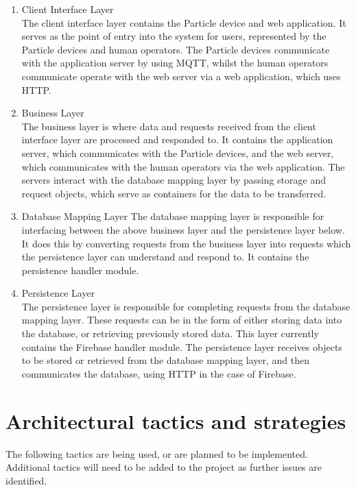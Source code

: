 \documentclass{article}
\begin{document}
		\begin{enumerate}
			\item Client Interface Layer\\
			The client interface layer contains the Particle device and web 
			application. It serves as the point of entry into the system for 
			users, represented by the Particle devices and human operators. 
			The Particle devices communicate with the application server by 
			using MQTT, whilst the human operators communicate operate with 
			the web server via a web application, which uses HTTP.
			\item Business Layer\\
			The business layer is where data and requests received from the 
			client interface layer are processed and responded to. It 
			contains the application server, which communicates with the 
			Particle devices, and the web server, which communicates with the 
			human operators via the web application. The servers interact 
			with the database mapping layer by passing storage and request 
			objects, which serve as containers for the data to be transferred.
			\item Database Mapping Layer
			The database mapping layer is responsible for interfacing between 
			the above business layer and the persistence layer below. It does 
			this by converting requests from the business layer into requests 
			which the persistence layer can understand and respond to. It 
			contains the persistence handler module.
			\item Persistence Layer\\
			The persistence layer is responsible for completing requests from 
			the database mapping layer. These requests can be in the form of 
			either storing data into the database, or retrieving previously 
			stored data. This layer currently contains the Firebase handler 
			module. The persistence layer receives objects to be stored or 
			retrieved from the database mapping layer, and then communicates 
			the database, using HTTP in the case of Firebase.
		\end{enumerate}

\newpage

\section{Architectural tactics and strategies}

The following tactics are being used, or are planned to be implemented. Additional 
tactics will need to be added to the project as further issues are identified.
\end{document}
